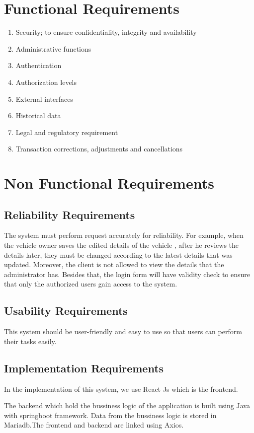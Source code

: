 \documentclass[a4paper, 12pt]{report}
\begin{document}
\section{Functional Requirements}
\begin{enumerate}
\item Security; to ensure confidentiality, integrity and availability
\item Administrative functions
\item Authentication
\item Authorization levels
\item External interfaces
\item Historical data
\item Legal and regulatory requirement
\item Transaction corrections, adjustments and cancellations
\end{enumerate}

\section{Non Functional Requirements}
\subsection{Reliability Requirements}
The system must perform request accurately for reliability. For example, when the
vehicle owner saves the edited details of the vehicle , after he reviews the details later, they must be
changed according to the latest details that was updated. Moreover, the client is not allowed to
view the details that the administrator has. Besides that, the login form will have validity check
to ensure that only the authorized users gain access to the system.
\subsection{Usability Requirements}
This system should be user-friendly and easy to use so that users can perform their tasks easily.
\subsection{Implementation Requirements}
In the implementation of this system, we use React Js which is the frontend.\par 
The backend which hold the bussiness logic of the application is built using Java with springboot framework. Data from the bussiness logic is stored in Mariadb.The frontend and backend are linked using Axios.
\end{document}
